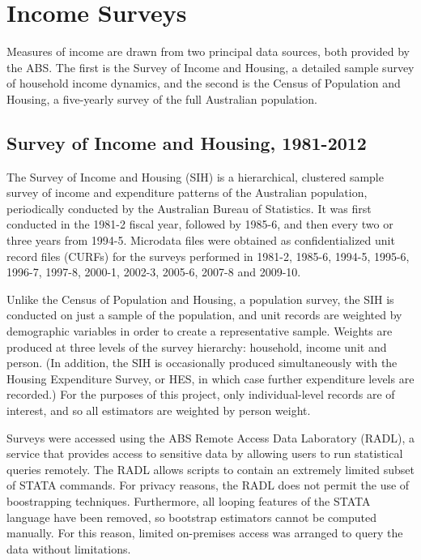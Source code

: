 \chapter{Income Surveys}\label{app:data}

Measures of income are drawn from two principal data sources, both provided by the ABS. The first is the Survey of Income and Housing, a detailed sample survey of household income dynamics, and the second is the Census of Population and Housing, a five-yearly survey of the full Australian population. 

\section{Survey of Income and Housing, 1981-2012}\label{sec:SIH}

The Survey of Income and Housing (SIH) is a hierarchical, clustered sample survey of income and expenditure patterns of the Australian population, periodically conducted by the Australian Bureau of Statistics. It was first conducted in the 1981-2 fiscal year, followed by 1985-6, and then every two or three years from 1994-5. Microdata files were obtained as confidentialized unit record files (CURFs) for the surveys performed in 1981-2, 1985-6, 1994-5, 1995-6, 1996-7, 1997-8, 2000-1, 2002-3, 2005-6, 2007-8 and 2009-10.

Unlike the Census of Population and Housing, a population survey, the SIH is conducted on just a sample of the population, and unit records are weighted by demographic variables in order to create a representative sample. Weights are produced at three levels of the survey hierarchy: household, income unit and person. (In addition, the SIH is occasionally produced simultaneously with the Housing Expenditure Survey, or HES, in which case further expenditure levels are recorded.) For the purposes of this project, only individual-level records are of interest, and so all estimators are weighted by person weight.

Surveys were accessed using the ABS Remote Access Data Laboratory (RADL), a service that provides access to sensitive data by allowing users to run statistical queries remotely. The RADL allows scripts to contain an extremely limited subset of STATA commands. For privacy reasons, the RADL does not permit the use of boostrapping techniques. Furthermore, all looping features of the STATA language have been removed, so bootstrap estimators cannot be computed manually.  For this reason, limited on-premises access was arranged to query the data without limitations.

